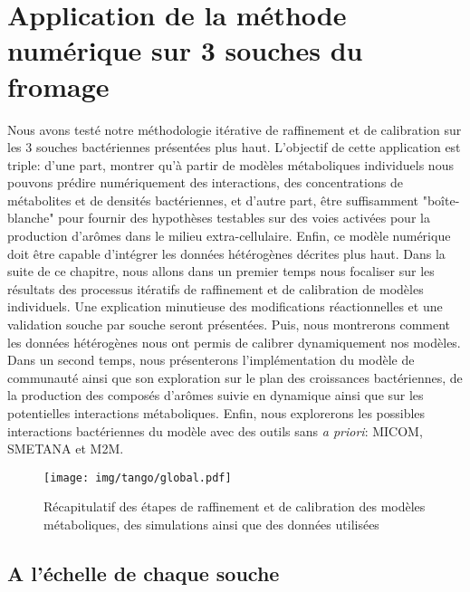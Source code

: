 \section{Application de la méthode numérique sur 3 souches du fromage}
Nous avons testé notre méthodologie itérative de raffinement et de calibration sur les 3 souches bactériennes présentées plus haut. L'objectif de cette application est triple: d'une part, montrer qu'à partir de modèles métaboliques individuels nous pouvons prédire numériquement des interactions, des concentrations de métabolites et de densités bactériennes, et d'autre part, être suffisamment "boîte-blanche" pour fournir des hypothèses testables sur des voies activées pour la production d'arômes dans le milieu extra-cellulaire. Enfin, ce modèle numérique doit être capable d'intégrer les données hétérogènes décrites plus haut. Dans la suite de ce chapitre, nous allons dans un premier temps nous focaliser sur les résultats des processus itératifs de raffinement et de calibration de modèles individuels. Une explication minutieuse des modifications réactionnelles et une validation souche par souche seront présentées. Puis, nous montrerons comment les données hétérogènes nous ont permis de calibrer dynamiquement nos modèles. Dans un second temps, nous présenterons l'implémentation du modèle de communauté ainsi que son exploration sur le plan des croissances bactériennes, de la production des composés d'arômes suivie en dynamique ainsi que sur les potentielles interactions métaboliques. Enfin, nous explorerons les possibles interactions bactériennes du modèle avec des outils sans \textit{a priori}: MICOM, SMETANA et M2M.


\begin{figure}
    \centering
    \texttt{[image: img/tango/global.pdf]}
    \caption{Récapitulatif des étapes de raffinement et de calibration des modèles métaboliques, des simulations ainsi que des données utilisées}
    \label{fig:my_label}
\end{figure}

\subsection{A l'échelle de chaque souche}


